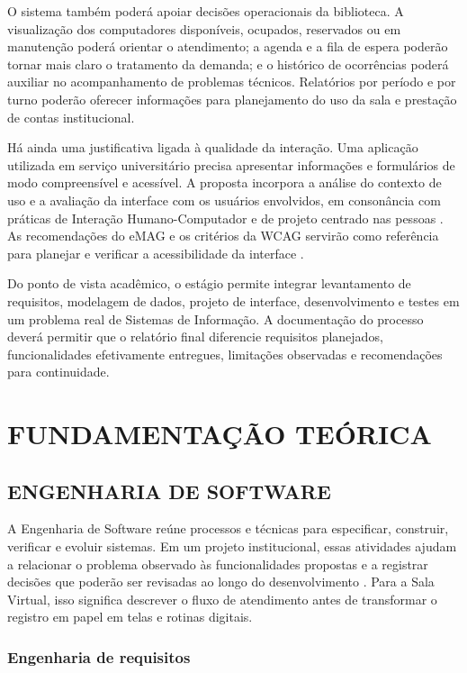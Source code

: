 \documentclass[12pt,a4paper]{article}
\newcommand{\secao}[1]{\clearpage\section{#1}}
\begin{document}
O sistema também poderá apoiar decisões operacionais da biblioteca. A visualização dos computadores disponíveis, ocupados, reservados ou em manutenção poderá orientar o atendimento; a agenda e a fila de espera poderão tornar mais claro o tratamento da demanda; e o histórico de ocorrências poderá auxiliar no acompanhamento de problemas técnicos. Relatórios por período e por turno poderão oferecer informações para planejamento do uso da sala e prestação de contas institucional.

Há ainda uma justificativa ligada à qualidade da interação. Uma aplicação utilizada em serviço universitário precisa apresentar informações e formulários de modo compreensível e acessível. A proposta incorpora a análise do contexto de uso e a avaliação da interface com os usuários envolvidos, em consonância com práticas de Interação Humano-Computador e de projeto centrado nas pessoas \cite{barbosaSilva2010,iso9241_210_2019}. As recomendações do eMAG e os critérios da WCAG servirão como referência para planejar e verificar a acessibilidade da interface \cite{emag2014,wcag22_2024}.

Do ponto de vista acadêmico, o estágio permite integrar levantamento de requisitos, modelagem de dados, projeto de interface, desenvolvimento e testes em um problema real de Sistemas de Informação. A documentação do processo deverá permitir que o relatório final diferencie requisitos planejados, funcionalidades efetivamente entregues, limitações observadas e recomendações para continuidade.

\secao{FUNDAMENTAÇÃO TEÓRICA}

\subsection{ENGENHARIA DE SOFTWARE}

A Engenharia de Software reúne processos e técnicas para especificar, construir, verificar e evoluir sistemas. Em um projeto institucional, essas atividades ajudam a relacionar o problema observado às funcionalidades propostas e a registrar decisões que poderão ser revisadas ao longo do desenvolvimento \cite{sommerville2016}. Para a Sala Virtual, isso significa descrever o fluxo de atendimento antes de transformar o registro em papel em telas e rotinas digitais.

\subsubsection{Engenharia de requisitos}
\end{document}
